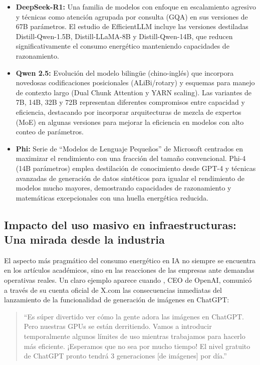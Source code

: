 \begin{itemize}
    \item \textbf{DeepSeek-R1:} Una familia de modelos con enfoque en escalamiento agresivo y técnicas como atención agrupada por consulta (GQA) en sus versiones de 67B parámetros. El estudio de EfficientLLM incluye las versiones destiladas Distill-Qwen-1.5B, Distill-LLaMA-8B y Distill-Qwen-14B, que reducen significativamente el consumo energético manteniendo capacidades de razonamiento.
    
    \item \textbf{Qwen 2.5:} Evolución del modelo bilingüe (chino-inglés) que incorpora novedosas codificaciones posicionales (ALiBi/rotary) y esquemas para manejo de contexto largo (Dual Chunk Attention y YARN scaling). Las variantes de 7B, 14B, 32B y 72B representan diferentes compromisos entre capacidad y eficiencia, destacando por incorporar arquitecturas de mezcla de expertos (MoE) en algunas versiones para mejorar la eficiencia en modelos con alto conteo de parámetros.
    
    \item \textbf{Phi:} Serie de ``Modelos de Lenguaje Pequeños'' de Microsoft centrados en maximizar el rendimiento con una fracción del tamaño convencional. Phi-4 (14B parámetros) emplea destilación de conocimiento desde GPT-4 y técnicas avanzadas de generación de datos sintéticos para igualar el rendimiento de modelos mucho mayores, demostrando capacidades de razonamiento y matemáticas excepcionales con una huella energética reducida.
\end{itemize}

\subsection{Impacto del uso masivo en infraestructuras: Una mirada desde la industria}

El aspecto más pragmático del consumo energético en IA no siempre se encuentra en los artículos académicos, sino en las reacciones de las empresas ante demandas operativas reales\@. Un claro ejemplo aparece cuando \textcite{altman2024gpus}, CEO de OpenAI, comunicó a través de su cuenta oficial de X.com las consecuencias inmediatas del lanzamiento de la funcionalidad de generación de imágenes en ChatGPT:

\begin{quote}
``Es súper divertido ver cómo la gente adora las imágenes en ChatGPT\@. Pero nuestras GPUs se están derritiendo\@. Vamos a introducir temporalmente algunos límites de uso mientras trabajamos para hacerlo más eficiente\@. ¡Esperamos que no sea por mucho tiempo! El nivel gratuito de ChatGPT pronto tendrá 3 generaciones [de imágenes] por día\@.''
\end{quote}

